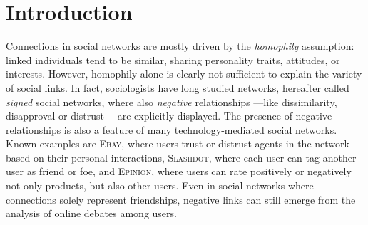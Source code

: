 \section{Introduction}

Connections in social networks are mostly driven by the \emph{homophily} assumption: linked
individuals tend to be similar, sharing personality traits, attitudes, or interests. However,
homophily alone is clearly not sufficient to explain the variety of social links. In fact, sociologists have long studied networks, hereafter called \emph{signed} social
networks, where also {\em negative} relationships ---like dissimilarity, disapproval or
distrust--- are explicitly displayed. The presence of negative relationships is also a feature of
many technology-mediated social networks. Known examples are \textsc{Ebay}, where users trust or
distrust agents in the network based on their personal interactions, \textsc{Slashdot}, where each
user can tag another user as friend or foe, and \textsc{Epinion}, where users can rate positively
or negatively not only products, but also other users. Even in social networks where connections
solely represent friendships, negative links can still emerge from the analysis of online debates
among users.


